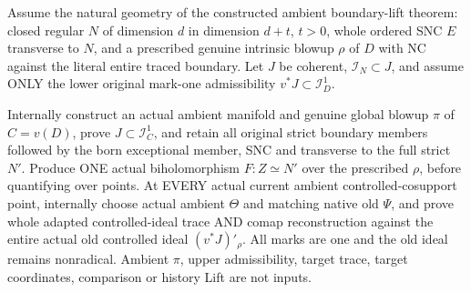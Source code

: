 \begin{theorem}
\label{hir:disjoint-constructed-controlled-lift}
\leanok
Assume the natural geometry of the constructed ambient boundary-lift theorem:
closed regular $N$ of dimension $d$ in dimension $d+t$, $t>0$, whole ordered
SNC $E$ transverse to $N$, and a prescribed genuine intrinsic blowup $\rho$
of $D$ with NC against the literal entire traced boundary. Let $J$ be coherent,
$\mathcal I_N\subset J$, and assume ONLY the lower original mark-one
admissibility $v^*J\subset\mathcal I_D^1$.

Internally construct an actual ambient manifold and genuine global blowup
$\pi$ of $C=v(D)$, prove $J\subset\mathcal I_C^1$, and retain all original
strict boundary members followed by the born exceptional member, SNC and
transverse to the full strict $N'$. Produce ONE actual biholomorphism
$F:Z\simeq N'$ over the prescribed $\rho$, before quantifying over points.
At EVERY actual current ambient controlled-cosupport point, internally
choose actual ambient $\Theta$ and matching native old $\Psi$, and prove
whole adapted controlled-ideal trace AND comap reconstruction against the
entire actual old controlled ideal $(v^*J)'_\rho$. All marks are one and the
old ideal remains nonradical. Ambient $\pi$, upper admissibility, target
trace, target coordinates, comparison or history Lift are not inputs.
\end{theorem}
